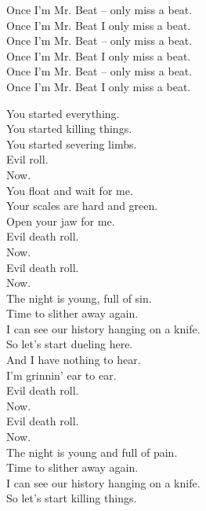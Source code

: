 Once I'm Mr. Beat -- only miss a beat. \\
Once I'm Mr. Beat I only miss a beat. \\
Once I'm Mr. Beat -- only miss a beat. \\
Once I'm Mr. Beat I only miss a beat. \\
Once I'm Mr. Beat -- only miss a beat. \\
Once I'm Mr. Beat I only miss a beat. \\




You started everything. \\
You started killing things. \\
You started severing limbs. \\

Evil  roll. \\
Now. \\

You float and wait for me. \\
Your scales are hard and green. \\
Open your jaw for me. \\

Evil death roll. \\
Now. \\
Evil death roll. \\
Now. \\

The night is young, full of sin. \\
Time to slither away again. \\
I can see our history hanging on a knife. \\

So let's start dueling here. \\
And I have nothing to hear. \\
I'm grinnin' ear to ear. \\

Evil death roll. \\
Now. \\
Evil death roll. \\
Now. \\

The night is young and full of pain. \\
Time to slither away again. \\
I can see our history hanging on a knife. \\
So let's start killing things. \\

